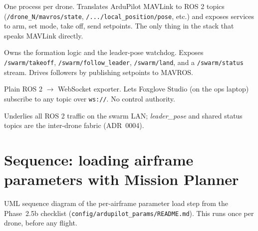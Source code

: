 \documentclass[11pt,a4paper]{article}
\begin{document}
\begin{description}[leftmargin=1.5em, style=nextline, font=\bfseries\color{jetsonteal}]
  \item[MAVROS] One process per drone. Translates ArduPilot MAVLink to ROS 2 topics
    (\texttt{/drone\_N/mavros/state}, \texttt{/.../local\_position/pose}, etc.) and exposes
    services to arm, set mode, take off, send setpoints. The only thing in the stack
    that speaks MAVLink directly.
  \item[swarm\_server] Owns the formation logic and the leader-pose watchdog. Exposes
    \texttt{/swarm/takeoff}, \texttt{/swarm/follow\_leader}, \texttt{/swarm/land}, and a
    \texttt{/swarm/status} stream. Drives followers by publishing setpoints to MAVROS.
  \item[foxglove\_bridge] Plain ROS 2 $\rightarrow$ WebSocket exporter. Lets Foxglove Studio
    (on the ops laptop) subscribe to any topic over \texttt{ws://}. No control authority.
  \item[Cyclone DDS] Underlies all ROS 2 traffic on the swarm LAN; \emph{leader\_pose}
    and shared status topics are the inter-drone fabric (ADR~0004).
\end{description}

\newpage

\section{Sequence: loading airframe parameters with Mission Planner}

UML sequence diagram of the per-airframe parameter load step from the
Phase~2.5b checklist (\texttt{config/ardupilot\_params/README.md}).
This runs once per drone, before any flight.
\end{document}

